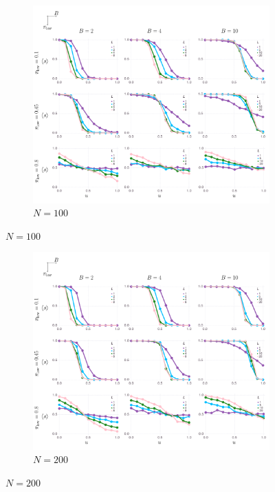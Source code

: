 \documentclass[letterpaper,11.5pt]{scrartcl}
\begin{document}
\begin{figure}
  \ContinuedFloat
	\begin{subfigure}{\textwidth}
	  \caption{$N=100$}
	  \includegraphics[width=\textwidth]{Figures/mainResultsPlots.pdf}
	\end{subfigure}
\end{figure}
	
\begin{figure}
  \ContinuedFloat
	\begin{subfigure}{\textwidth}
	  \caption{$N=200$}
	  \includegraphics[width=\textwidth]{Figures/supplement/nagents=200/mainResultsPlots.pdf}
	\end{subfigure}
\end{figure}
\end{document}
